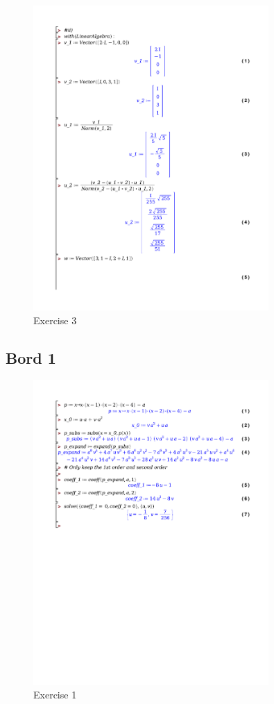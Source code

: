 \documentclass[a4paper]{report}
\begin{document}
\begin{figure}[!htbp]
	\centering
	\includegraphics[width=0.8\textwidth]{./exercises/wc_1_ex_3.pdf}
	\caption{Exercise 3}
\end{figure}

\newpage
\subsection*{Bord 1}

\begin{figure}[!htbp]
	\centering
	\includegraphics[width=0.8\textwidth]{./exercises/bordles_1.pdf}
	\caption{Exercise 1}
\end{figure}
\end{document}
